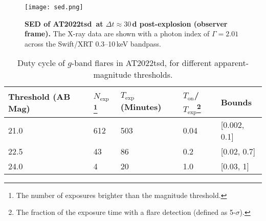 \documentclass{nature_plusfigure}
\newcommand{\at}{AT2022tsd}
\begin{document}
\begin{extended_data}

\begin{figure}[!ht]
 \centering
\texttt{[image: sed.png]}
  \caption{\textbf{SED of \at\ at $\Delta t\approx30\,$d post-explosion (observer frame).} The X-ray data are shown with a photon index of $\Gamma=2.01$ across the Swift/XRT 0.3--10\,keV bandpass.}
 \label{fig:full-sed}
\end{figure}

\begin{center} 
\begin{longtable}{lllll} 
\caption{Duty cycle of $g$-band flares in \at, for different apparent-magnitude thresholds.} 
\label{tab:flare-stats}\\ 
\hline\hline
Threshold (AB Mag) & $N_\mathrm{exp}$\footnote{The number of exposures brighter than the magnitude threshold.} & $T_\mathrm{exp}$ (Minutes) & $T_\mathrm{on}$/$T_\mathrm{exp}$\footnote{The fraction of the exposure time with a flare detection (defined as 5-$\sigma$).} & Bounds \\
\hline
21.0 & 612 & 503 & 0.04 & [0.002, 0.1] \\
22.5 & 43 & 86 & 0.2 & [0.02, 0.7]  \\
24.0 & 4 & 20 & 1.0 & [0.03, 1] \\
\hline \hline
\end{longtable}
\end{center}

\end{extended_data}

\clearpage
\end{document}
